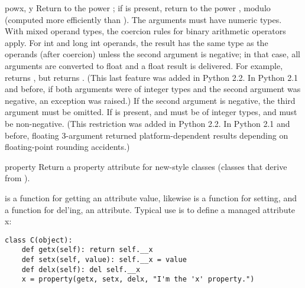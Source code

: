 \begin{funcdesc}{pow}{x, y}
  Return  to the power ; if  is present, return
   to the power , modulo  (computed more
  efficiently than ).  The
  arguments must have numeric types.  With mixed operand types, the
  coercion rules for binary arithmetic operators apply.  For int and
  long int operands, the result has the same type as the operands
  (after coercion) unless the second argument is negative; in that
  case, all arguments are converted to float and a float result is
  delivered.  For example,  returns , but
   returns .  (This last feature was added in
  Python 2.2.  In Python 2.1 and before, if both arguments were of integer
  types and the second argument was negative, an exception was raised.)
  If the second argument is negative, the third argument must be omitted.
  If  is present,  and  must be of integer types,
  and  must be non-negative.  (This restriction was added in
  Python 2.2.  In Python 2.1 and before, floating 3-argument 
  returned platform-dependent results depending on floating-point
  rounding accidents.)
\end{funcdesc}

\begin{funcdesc}{property}{}
  Return a property attribute for new-style classes (classes that
  derive from ).

   is a function for getting an attribute value, likewise
   is a function for setting, and  a function
  for del'ing, an attribute.  Typical use is to define a managed attribute x:

\begin{verbatim}
class C(object):
    def getx(self): return self.__x
    def setx(self, value): self.__x = value
    def delx(self): del self.__x
    x = property(getx, setx, delx, "I'm the 'x' property.")
\end{verbatim}

\end{funcdesc}

